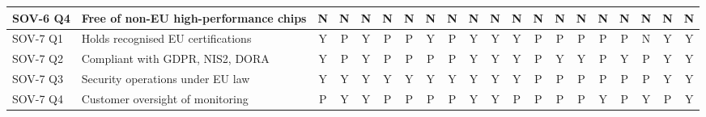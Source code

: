\begin{table}[p]
\begin{tabular}{@{}l l *{18}{c}@{}}
SOV-6 Q4 & Free of non-EU high-performance chips & \cellcolor{red!25}N & \cellcolor{red!25}N & \cellcolor{red!25}N & \cellcolor{red!25}N & \cellcolor{red!25}N & \cellcolor{red!25}N & \cellcolor{red!25}N & \cellcolor{red!25}N & \cellcolor{red!25}N & \cellcolor{red!25}N & \cellcolor{red!25}N & \cellcolor{red!25}N & \cellcolor{red!25}N & \cellcolor{red!25}N & \cellcolor{red!25}N & \cellcolor{red!25}N & \cellcolor{red!25}N & \cellcolor{red!25}N \\
\midrule
SOV-7 Q1 & Holds recognised EU certifications & \cellcolor{green!22}Y & \cellcolor{orange!25}P & \cellcolor{green!22}Y & \cellcolor{orange!25}P & \cellcolor{orange!25}P & \cellcolor{green!22}Y & \cellcolor{orange!25}P & \cellcolor{green!22}Y & \cellcolor{green!22}Y & \cellcolor{green!22}Y & \cellcolor{orange!25}P & \cellcolor{orange!25}P & \cellcolor{orange!25}P & \cellcolor{orange!25}P & \cellcolor{orange!25}P & \cellcolor{red!25}N & \cellcolor{green!22}Y & \cellcolor{green!22}Y \\
SOV-7 Q2 & Compliant with GDPR, NIS2, DORA & \cellcolor{green!22}Y & \cellcolor{orange!25}P & \cellcolor{green!22}Y & \cellcolor{orange!25}P & \cellcolor{orange!25}P & \cellcolor{orange!25}P & \cellcolor{orange!25}P & \cellcolor{green!22}Y & \cellcolor{green!22}Y & \cellcolor{green!22}Y & \cellcolor{orange!25}P & \cellcolor{green!22}Y & \cellcolor{green!22}Y & \cellcolor{orange!25}P & \cellcolor{green!22}Y & \cellcolor{orange!25}P & \cellcolor{green!22}Y & \cellcolor{green!22}Y \\
SOV-7 Q3 & Security operations under EU law & \cellcolor{green!22}Y & \cellcolor{green!22}Y & \cellcolor{green!22}Y & \cellcolor{green!22}Y & \cellcolor{green!22}Y & \cellcolor{green!22}Y & \cellcolor{green!22}Y & \cellcolor{green!22}Y & \cellcolor{green!22}Y & \cellcolor{green!22}Y & \cellcolor{orange!25}P & \cellcolor{orange!25}P & \cellcolor{orange!25}P & \cellcolor{orange!25}P & \cellcolor{orange!25}P & \cellcolor{orange!25}P & \cellcolor{green!22}Y & \cellcolor{green!22}Y \\
SOV-7 Q4 & Customer oversight of monitoring & \cellcolor{orange!25}P & \cellcolor{green!22}Y & \cellcolor{green!22}Y & \cellcolor{orange!25}P & \cellcolor{orange!25}P & \cellcolor{orange!25}P & \cellcolor{orange!25}P & \cellcolor{green!22}Y & \cellcolor{green!22}Y & \cellcolor{orange!25}P & \cellcolor{orange!25}P & \cellcolor{orange!25}P & \cellcolor{orange!25}P & \cellcolor{green!22}Y & \cellcolor{orange!25}P & \cellcolor{green!22}Y & \cellcolor{orange!25}P & \cellcolor{green!22}Y \\

\end{tabular}
\end{table}
